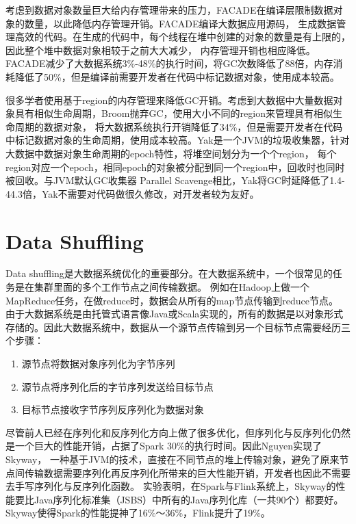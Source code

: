 考虑到数据对象数量巨大给内存管理带来的压力，FACADE\cite{nguyen2015facade}在编译层限制数据对象的数量，以此降低内存管理开销。FACADE编译大数据应用源码，
生成数据管理高效的代码。在生成的代码中，每个线程在堆中创建的对象的数量是有上限的，因此整个堆中数据对象相较于之前大大减少，
内存管理开销也相应降低。FACADE减少了大数据系统3\%-48\%的执行时间，将GC次数降低了88倍，内存消耗降低了50\%，但是编译前需要开发者在代码中标记数据对象，使用成本较高。

很多学者使用基于region的内存管理来降低GC开销。考虑到大数据中大量数据对象具有相似生命周期，Broom\cite{gog2015broom}抛弃GC，使用大小不同的region来管理具有相似生命周期的数据对象，
将大数据系统执行开销降低了34\%，但是需要开发者在代码中标记数据对象的生命周期，使用成本较高。Yak\cite{nguyen2016yak}是一个JVM的垃圾收集器，针对大数据中数据对象生命周期的epoch特性，将堆空间划分为一个个region，
每个region对应一个epoch，相同epoch的对象被分配到同一个region中，回收时也同时被回收。与JVM默认GC收集器 Parallel Scavenge相比，Yak将GC时延降低了1.4-44.3倍，Yak不需要对代码做很久修改，对开发者较为友好。

\section{Data Shuffling}
Data shuffling是大数据系统优化的重要部分\cite{costa2012camdoop, islam2012high, wang2011hadoop}。在大数据系统中，一个很常见的任务是在集群里面的多个工作节点之间传输数据。
例如在Hadoop上做一个MapReduce任务，在做reduce时，数据会从所有的map节点传输到reduce节点。
由于大数据系统是由托管式语言像Java或Scala实现的，所有的数据是以对象形式存储的。因此大数据系统中，数据从一个源节点传输到另一个目标节点需要经历三个步骤：
\begin{enumerate}
    \item 源节点将数据对象序列化为字节序列
    \item 源节点将序列化后的字节序列发送给目标节点
    \item 目标节点接收字节序列反序列化为数据对象
\end{enumerate}
尽管前人已经在序列化和反序列化方向上做了很多优化，但序列化与反序列化仍然是一个巨大的性能开销，占据了Spark 30\%的执行时间。因此Nguyen实现了Skyway\cite{nguyen2018skyway}，
一种基于JVM的技术，直接在不同节点的堆上传输对象，避免了原来节点间传输数据需要序列化再反序列化所带来的巨大性能开销，开发者也因此不需要去手写序列化与反序列化函数。
实验表明，在Spark与Flink系统上，Skyway的性能要比Java序列化标准集（JSBS）中所有的Java序列化库（一共90个）都要好。Skyway使得Spark的性能提神了16\%～36\%，Flink提升了19\%。


